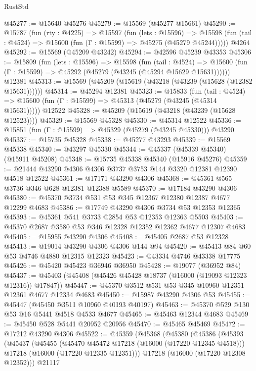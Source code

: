 \begin{lexlean}{RustStd}
\begin{coremodule}
@45277 := @15640 @45276
@45279 := @15569 (@45277 @15661)
@45290 := @15787
    (fun (rty : @4225) =>
    @15597
      (fun (lets : @15596) =>
      @15598 (fun (tail : @4524) => @15600 (fun (Γ : @15599) => @45275 (@45279 @45244)))))
    @4264
@45292 := @15569 (@45209 @43242)
@45294 := @42596 @45239 @43353
@45306 := @15809
    (fun (lets : @15596) =>
    @15598
      (fun (tail : @4524) =>
      @15600 (fun (Γ : @15599) => @45292 (@45279 (@43245 (@45294 @15629 @15631))))))
    @12381
@45313 := @15569 (@45209 (@15619 (@43218 (@43239 (@15628 (@12382 @15631))))))
@45314 := @45294 @12381
@45323 := @15833
    (fun (tail : @4524) => @15600 (fun (Γ : @15599) => @45313 (@45279 (@43245 (@45314 @15631)))))
    @12522
@45328 := @45209 (@15619 (@43218 (@43239 (@15628 @12523))))
@45329 := @15569 @45328
@45330 := @45314 @12522
@45336 := @15851 (fun (Γ : @15599) => @45329 (@45279 (@43245 @45330))) @43290
@45337 := @15735 @45328
@45338 := @45277 @43293
@45339 := @15569 @45338
@45340 := @43297 @45330
@45344 := @45337 (@45339 @45340) (@15911 @45208)
@45348 := @15735 @45338 @45340 (@15916 @45276)
@45359 := @21444 @43290 @4306 @4306 @3737 @3753 @144 @3320 @12381 @12390 @4518 @12522
@45361 := @17171 @43290 @4306
@45368 := @45361 @565 @3736 @346 @628 @12381 @12388 @5589
@45370 := @17184 @43290 @4306
@45380 := @45370 @3734 @531 @53 @345 @12367 @12380 @12387 @4677 @12299 @4683
@45386 := @17749 @43290 @4306 @3734 @53 @12353 @12365
@45393 := @45361 @541 @3733 @2854 @53 @12353 @12363 @5503
@45403 := @45370 @2687 @3580 @53 @346 @12328 @12352 @12362 @4677 @12307 @4683
@45405 := @15955 @43290 @4306
@45408 := @45405 @2687 @53 @12328
@45413 := @19014 @43290 @4306 @4306 @144 @94
@45420 := @45413 @84 @60 @53 @4746 @4880 @12315 @12323
@45423 := @43334 @4746 @43338 @17775
@45426 := @45420 @45423 @36946 @36950
@45428 := @19077 (@36952 @84)
@45437 := @45403 (@45408 (@45426 @45428 @18737 (@16000 (@19093 @12323 @12316)) @17847))
@45447 := @45370 @3512 @531 @53 @345 @10960 @12351 @12361 @4677 @12334 @4683
@45450 := @15987 @43290 @4306 @53
@45455 := @45447 (@45450 @3511 @10960 @40193 @40197)
@45463 := @45370 @529 @130 @53 @16 @5441 @4518 @4533 @4677
@45465 := @45463 @12344 @4683
@45469 := @45450 @528 @5441 @20952 @20956
@45470 := @45465 @45469
@45472 := @17212 @43290 @4306
@45522 := @45359
    (@45368
      (@45380
        (@45386
          (@45393
            (@45437
              (@45455
                (@45470 @45472 @17218 (@16000 (@17220 @12345 @4518)))
                @17218
                (@16000 (@17220 @12335 @12351)))
              @17218
              (@16000 (@17220 @12308 @12352)))
            @21117

\end{coremodule}
\end{lexlean}
